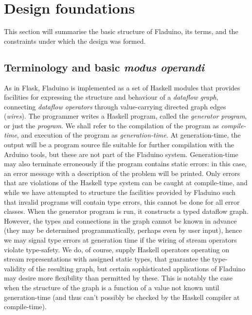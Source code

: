 \documentclass[a4paper, oneside, final]{memoir}
\begin{document}
\section{Design foundations}

This section will summarise the basic structure of Fladuino, its
terms, and the constraints under which the design was formed.

\subsection{Terminology and basic \textit{modus operandi}}

As in Flask, Fladuino is implemented as a set of Haskell modules that
provides facilities for expressing the structure and behaviour of a
\textit{dataflow graph}, connecting \textit{dataflow operators}
through value-carrying directed graph edges (\textit{wires}).
 The
programmer writes a Haskell program, called the \textit{generator
  program}, or just the \textit{program}.  We shall refer to the
compilation of the program as \textit{compile-time}, and execution of
the program as \textit{generation-time}.  At generation-time, the
output will be a program source file suitable for further compilation
with the Arduino tools, but these are not part of the Fladuino system.
Generation-time may also terminate erroneously if the program
contains static errors: in this case, an error message with a
description of the problem will be printed.  Only errors that are
violations of the Haskell type system can be caught at compile-time,
and while we have attempted to structure the facilities provided by
Fladuino such that invalid programs will contain type errors, this
cannot be done for all error classes.  When the generator program is
run, it constructs a typed dataflow graph.  However, the types and
connections in the graph cannot be known in advance (they may be
determined programmatically, perhaps even by user input), hence we may
signal type errors at generation time if the wiring of stream
operators violate type-safety.  We do, of course, supply Haskell
operators operating on stream representations with assigned static
types, that guarantee the type-validity of the resulting graph, but
certain sophisticated applications of Fladuino may desire more
flexibility than permitted by these.  This is notably the case when
the structure of the graph is a function of a value not known until
generation-time (and thus can't possibly be checked by the Haskell
compiler at compile-time).
\end{document}
